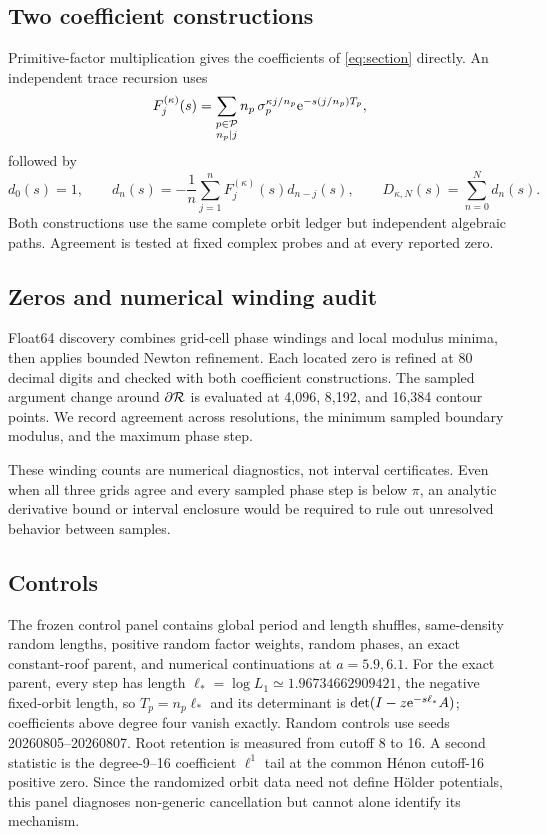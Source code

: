 \subsection{Two coefficient constructions}

Primitive-factor multiplication gives the coefficients of
\eqref{eq:section} directly.  An independent trace recursion uses
\begin{equation}
 F_j^{(\kappa)}(s)=
 \sum_{\substack{p\in\mathcal{P}\\n_p\mid j}}
 n_p\,\sigma_p^{\kappa j/n_p}\mathrm{e}^{-s(j/n_p)T_p},
 \label{eq:traces}
\end{equation}
followed by
\begin{equation}
 d_0(s)=1,\qquad
 d_n(s)=-\frac1n\sum_{j=1}^nF_j^{(\kappa)}(s)d_{n-j}(s),
 \qquad
 D_{\kappa,N}(s)=\sum_{n=0}^N d_n(s).
 \label{eq:cumulant}
\end{equation}
Both constructions use the same complete orbit ledger but independent
algebraic paths.  Agreement is tested at fixed complex probes and at every
reported zero.

\subsection{Zeros and numerical winding audit}

Float64 discovery combines grid-cell phase windings and local modulus minima,
then applies bounded Newton refinement.  Each located zero is refined at 80
decimal digits and checked with both coefficient constructions.  The sampled
argument change around \(\partial\mathcal{R}\) is evaluated at 4,096, 8,192, and
16,384 contour points.  We record agreement across resolutions, the minimum
sampled boundary modulus, and the maximum phase step.

These winding counts are numerical diagnostics, not interval certificates.
Even when all three grids agree and every sampled phase step is below \(\pi\),
an analytic derivative bound or interval enclosure would be required to rule
out unresolved behavior between samples.

\subsection{Controls}

The frozen control panel contains global period and length shuffles,
same-density random lengths, positive random factor weights, random phases, an
exact constant-roof parent, and numerical continuations at \(a=5.9,6.1\).
For the exact parent, every step has length
\(\ell_*=\log L_1\simeq1.96734662909421\), the negative fixed-orbit length,
so \(T_p=n_p\ell_*\) and its determinant is
\(\det(I-z\mathrm{e}^{-s\ell_*}A)\); coefficients above degree four vanish exactly.
Random controls use seeds 20260805--20260807.  Root retention is measured from
cutoff 8 to 16.  A second statistic is the degree-9--16 coefficient
\(\ell^1\) tail at the common H\'enon cutoff-16 positive zero.  Since the
randomized orbit data need not define H\"older potentials, this panel diagnoses
non-generic cancellation but cannot alone identify its mechanism.
